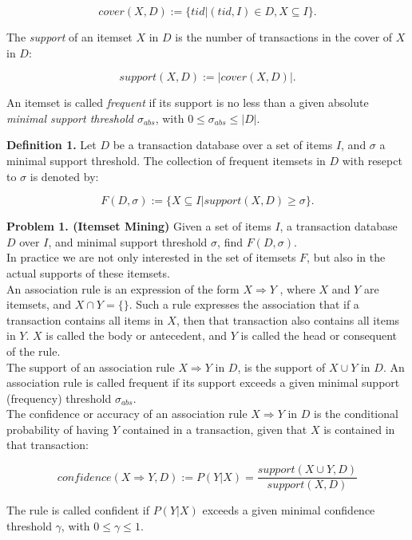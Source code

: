 \documentclass{article}
\begin{document}
\[cover(X, D) := \{tid | (tid, I) \in D, X \subseteq I\}. \]

The {\sl support} of an itemset $X$ in $D$ is the number of transactions in the cover of $X$ in $D$:

\[support(X, D) := |cover(X,D)|.\]

An itemset is called {\sl frequent} if its support is no less than a given absolute {\sl minimal support threshold $\sigma_{abs}$}, with  $0 \le \sigma_{abs} \le |D|$.

{\bf Definition 1.} Let $D$ be a transaction database over a set of items $I$, and $\sigma$ a minimal support threshold. The collection of frequent itemsets in $D$ with resepct to $\sigma$ is denoted by: 

\[F(D,\sigma) := \{X \subseteq I | support(X, D) \ge \sigma\}.\]

{\bf Problem 1. (Itemset Mining)} Given a set of items $I$, a transaction database $D$ over $I$, and minimal support threshold $\sigma$, find $F(D, \sigma)$.\\

In practice we are not only interested in the set of itemsets $F$, but also
in the actual supports of these itemsets.\\

An association rule is an expression of the form $X \Rightarrow Y$ ,
where $X$ and $Y$ are itemsets, and $X \cap Y = \{\}$. Such a rule
expresses the association that if a transaction contains all items in
$X$, then that transaction also contains all items in $Y$. $X$ is called
the body or antecedent, and $Y$ is called the head or consequent of the
rule.\\

The support of an association rule $X \Rightarrow Y$ in $D$, is the
support of $X \cup Y$ in $D$. An association rule is called
frequent if its support exceeds a given minimal support
(frequency) threshold $\sigma_{abs}$. \\

The confidence or accuracy of an association rule $X \Rightarrow Y$ in
$D$ is the conditional probability of having $Y$ contained in a
transaction, given that $X$ is contained in that transaction:

\[confidence(X \Rightarrow Y, D) := P(Y|X) = \frac{support(X \cup Y, D)}{support(X,D)}\]

The rule is called confident if $P(Y|X)$ exceeds a given minimal confidence threshold $\gamma$, with $0 \le \gamma \le 1$. \\
\end{document}

